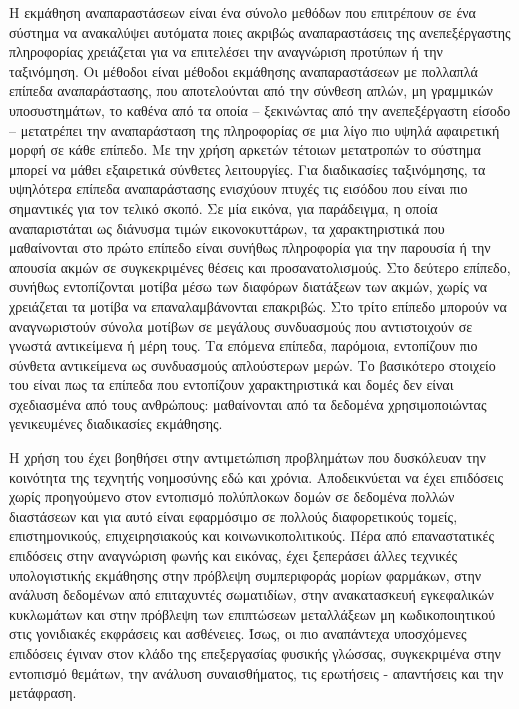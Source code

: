 Η εκμάθηση αναπαραστάσεων είναι ένα σύνολο μεθόδων που επιτρέπουν σε ένα σύστημα να ανακαλύψει αυτόματα ποιες ακριβώς αναπαραστάσεις της ανεπεξέργαστης πληροφορίας χρειάζεται για να επιτελέσει την αναγνώριση προτύπων ή την ταξινόμηση. Οι μέθοδοι  είναι μέθοδοι εκμάθησης αναπαραστάσεων με πολλαπλά επίπεδα αναπαράστασης, που αποτελούνται από την σύνθεση απλών, μη γραμμικών υποσυστημάτων, το καθένα από τα οποία -- ξεκινώντας από την ανεπεξέργαστη είσοδο -- μετατρέπει την αναπαράσταση της πληροφορίας σε μια λίγο πιο υψηλά αφαιρετική μορφή σε κάθε επίπεδο. Με την χρήση αρκετών τέτοιων μετατροπών το σύστημα μπορεί να μάθει εξαιρετικά σύνθετες λειτουργίες. Για διαδικασίες ταξινόμησης, τα υψηλότερα επίπεδα αναπαράστασης ενισχύουν πτυχές τις εισόδου που είναι πιο σημαντικές για τον τελικό σκοπό. Σε μία εικόνα, για παράδειγμα, η οποία αναπαριστάται ως διάνυσμα τιμών εικονοκυττάρων, τα χαρακτηριστικά που μαθαίνονται στο πρώτο επίπεδο είναι συνήθως πληροφορία για την παρουσία ή την απουσία ακμών σε συγκεκριμένες θέσεις και προσανατολισμούς. Στο δεύτερο επίπεδο, συνήθως εντοπίζονται μοτίβα μέσω των διαφόρων διατάξεων των ακμών, χωρίς να χρειάζεται τα μοτίβα να επαναλαμβάνονται επακριβώς. Στο τρίτο επίπεδο μπορούν να αναγνωριστούν σύνολα μοτίβων σε μεγάλους συνδυασμούς που αντιστοιχούν σε γνωστά αντικείμενα ή μέρη τους. Τα επόμενα επίπεδα, παρόμοια, εντοπίζουν πιο σύνθετα αντικείμενα ως συνδυασμούς απλούστερων μερών. Το βασικότερο στοιχείο του  είναι πως τα επίπεδα που εντοπίζουν χαρακτηριστικά και δομές δεν είναι σχεδιασμένα από τους ανθρώπους: μαθαίνονται από τα δεδομένα χρησιμοποιώντας γενικευμένες διαδικασίες εκμάθησης.

Η χρήση του  έχει βοηθήσει στην αντιμετώπιση προβλημάτων που δυσκόλευαν την κοινότητα της τεχνητής νοημοσύνης εδώ και χρόνια. Αποδεικνύεται να έχει επιδόσεις χωρίς προηγούμενο στον εντοπισμό πολύπλοκων δομών σε δεδομένα πολλών διαστάσεων και για αυτό είναι εφαρμόσιμο σε πολλούς διαφορετικούς τομείς, επιστημονικούς, επιχειρησιακούς και κοινωνικοπολιτικούς. Πέρα από επαναστατικές επιδόσεις στην αναγνώριση φωνής και εικόνας, έχει ξεπεράσει άλλες τεχνικές υπολογιστικής εκμάθησης στην πρόβλεψη συμπεριφοράς μορίων φαρμάκων, στην ανάλυση δεδομένων από επιταχυντές σωματιδίων, στην ανακατασκευή εγκεφαλικών κυκλωμάτων και στην πρόβλεψη των επιπτώσεων μεταλλάξεων μη κωδικοποιητικού  στις γονιδιακές εκφράσεις και ασθένειες. Ίσως, οι πιο αναπάντεχα υποσχόμενες επιδόσεις έγιναν στον κλάδο της επεξεργασίας φυσικής γλώσσας, συγκεκριμένα στην εντοπισμό θεμάτων, την ανάλυση συναισθήματος, τις ερωτήσεις - απαντήσεις και την μετάφραση.

